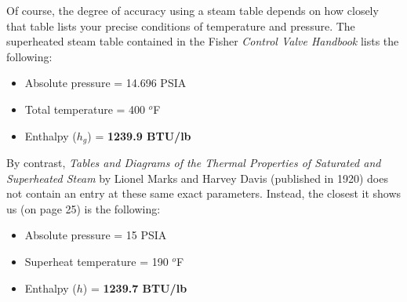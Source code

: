 \vskip 10pt

Of course, the degree of accuracy using a steam table depends on how closely that table lists your precise conditions of temperature and pressure.  The superheated steam table contained in the Fisher {\it Control Valve Handbook} lists the following:

\begin{itemize}
\item{} Absolute pressure = 14.696 PSIA
\item{} Total temperature = 400 $^{o}$F
\item{} Enthalpy ($h_g$) = {\bf 1239.9 BTU/lb}
\end{itemize}

\vskip 10pt

By contrast, {\it Tables and Diagrams of the Thermal Properties of Saturated and Superheated Steam} by Lionel Marks and Harvey Davis (published in 1920) does not contain an entry at these same exact parameters.  Instead, the closest it shows us (on page 25) is the following:

\begin{itemize}
\item{} Absolute pressure = 15 PSIA
\item{} Superheat temperature = 190 $^{o}$F
\item{} Enthalpy ($h$) = {\bf 1239.7 BTU/lb}
\end{itemize}




